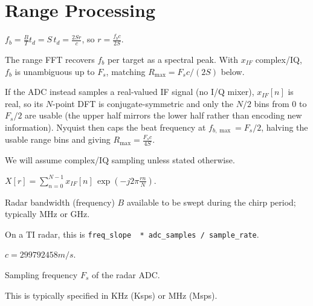 \section{Range Processing}

\begin{definition}
$f_b = \frac{B}{T}t_d = S\,t_d = \frac{2Sr}{c}$, so $r = \frac{f_bc}{2S}$.
\end{definition}
The range FFT recovers $f_b$ per target as a spectral peak. With $x_{IF}$ complex/IQ, $f_b$ is unambiguous up to $F_s$, matching $R_{\max} = F_sc/(2S)$ below.

\begin{remark}
If the ADC instead samples a real-valued IF signal (no I/Q mixer), $x_{IF}[n]$ is real, so its $N$-point DFT is conjugate-symmetric and only the $N/2$ bins from $0$ to $F_s/2$ are usable (the upper half mirrors the lower half rather than encoding new information). Nyquist then caps the beat frequency at $f_{b,\max} = F_s/2$, halving the usable range bins and giving $R_{\max} = \frac{F_sc}{4S}$.
\end{remark}

\begin{remark}
We will assume complex/IQ sampling unless stated otherwise.
\end{remark}

\begin{definition}
$X[r] = \sum_{n=0}^{N-1} x_{IF}[n]\,\exp\left(-j2\pi\frac{rn}{N}\right)$.
\end{definition}

\begin{definition}[Bandwidth]
Radar bandwidth (frequency) $B$ available to be swept during the chirp period; typically MHz or GHz.
\end{definition}

\begin{remark}[TI Implementation]
On a TI radar, this is \lstinline{freq_slope  * adc_samples / sample_rate}.
\end{remark}

\begin{definition}
$c = 299 792 458 m/s$.
\end{definition}

\begin{definition}
Sampling frequency $F_s$ of the radar ADC.
\end{definition}

\begin{remark}[Units]
This is typically specified in KHz (Ksps) or MHz (Msps).
\end{remark}

